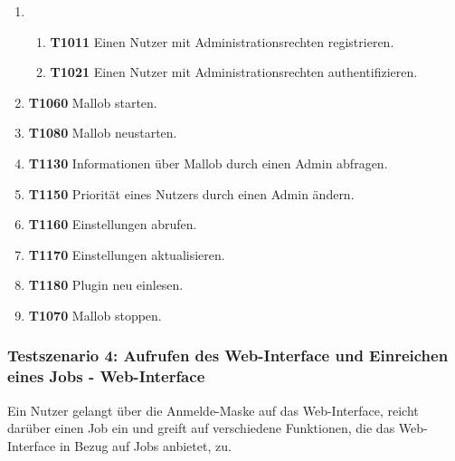 \begin{enumerate}
    \item
    \begin{enumerate}
        \item \textbf{T1011} Einen Nutzer mit Administrationsrechten registrieren.
        
        \item \textbf{T1021} Einen Nutzer mit Administrationsrechten authentifizieren. 
    \end{enumerate}
    
    \item \textbf{T1060} Mallob starten.
    
    \item \textbf{T1080} Mallob neustarten.
    
    \item \textbf{T1130} Informationen über Mallob durch einen Admin abfragen. 
    
    \item \textbf{T1150} Priorität eines Nutzers durch einen Admin ändern. 
    
    \item \textbf{T1160} Einstellungen abrufen.
    
    \item \textbf{T1170} Einstellungen aktualisieren. 
    
    \item \textbf{T1180} Plugin neu einlesen.
    
    \item \textbf{T1070} Mallob stoppen. 
\end{enumerate}

\subsubsection{Testszenario 4: Aufrufen des Web-Interface und Einreichen eines Jobs - Web-Interface}
Ein Nutzer gelangt über die Anmelde-Maske auf das Web-Interface, reicht darüber einen Job ein und greift auf verschiedene Funktionen, die das Web-Interface in Bezug auf Jobs anbietet, zu.

